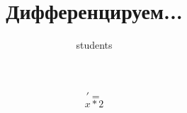 \documentclass{article}
\title{Дифференцируем...}
\begin{document}
\author{students}
\maketitle
\fontsize{14}{8pt}\selectfont
\begin{equation}
[{{x}^{{2}}}]' =
\end{equation}
\begin{equation}
{{x}*{2}}
\end{equation}
\end{document}
